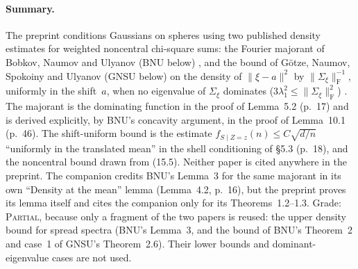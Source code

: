 \documentclass[11pt]{article}
\newcommand{\norm}[1]{\lVert #1\rVert}
\newcommand{\ploc}[2]{#1}
\newcommand{\sloc}[2]{\cite[#2]{#1}}
\newcommand{\grade}[1]{\textsc{#1}}
\begin{document}
\paragraph{Summary.}
The preprint conditions Gaussians on spheres using two published density
estimates for weighted noncentral chi-square sums: the Fourier majorant of
Bobkov, Naumov and Ulyanov (BNU below)
\sloc{BobkovNaumovUlyanov2020-DensityMaxWeightedChiSquare}{Lemma~3, p.~5},
and the bound of G\"otze, Naumov, Spokoiny and Ulyanov (GNSU below) on the
density of $\norm{\xi-a}^2$ by $\norm{\Sigma_\xi}_{\mathrm F}^{-1}$, uniformly
in the shift~$a$, when no eigenvalue of $\Sigma_\xi$ dominates
($3\lambda_1^2\le\norm{\Sigma_\xi}_{\mathrm F}^2$)
\sloc{GotzeEtAl2017-LargeBallGaussianComparison}{Thm~2.6,
p.~13}. The majorant is the dominating function in the proof of
\ploc{Lemma~5.2 (p.~17)}{profile-spectral.tex:400--428} and is derived
explicitly, by BNU's concavity argument, in the proof of
\ploc{Lemma~10.1 (p.~46)}{profile-orbits.tex:323--335}. The
shift-uniform bound is the estimate $f_{S\mid Z=z}(n)\le C\sqrt{d/n}$
``uniformly in the translated mean'' in the shell conditioning of
\ploc{\S5.3 (p.~18)}{profile-spectral.tex:441--458}, and the noncentral bound
drawn from \ploc{(15.5)}{cap-static.tex:164--175}. Neither paper is cited
anywhere in the preprint. The companion \cite{OAI-AcceptedCritical} credits
BNU's Lemma~3 for the same majorant in its own ``Density at the mean'' lemma
\ploc{(Lemma~4.2, p.~16)}{AcceptedCritical spherical.tex:144--165},
but the preprint proves its lemma itself and cites the companion only for its
Theorems~1.2--1.3. Grade: \grade{Partial}, because only a fragment of the two
papers is reused: the upper density bound for spread spectra (BNU's Lemma~3,
and the bound of BNU's Theorem~2 and case~1 of GNSU's Theorem~2.6). Their
lower bounds and dominant-eigenvalue cases are not used.
\end{document}
